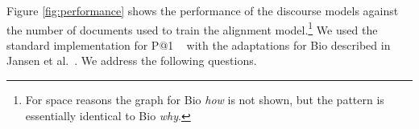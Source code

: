 Figure \ref{fig:performance} shows the performance of the discourse models against the number of documents used to train the alignment model.\footnote{For space reasons the graph for Bio \emph{how} is not shown, but the pattern is essentially identical to Bio \emph{why}.}   We used the standard implementation for P@1 ~\cite{manning08} with the adaptations for Bio described in Jansen et al.~\citeyear{jansen14}. We address the following questions.

